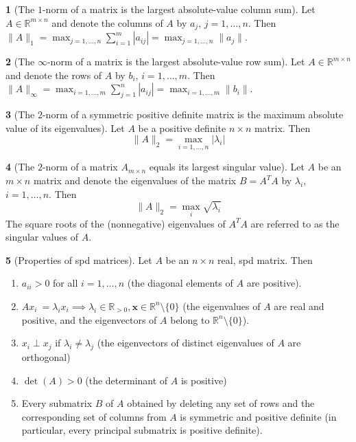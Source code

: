 \documentclass[12pt]{article}
\theoremstyle{definition}
\newtheorem{theorem}{\color{ForestGreen}{\textbf{Theorem}}}
\newcommand{\R}{\mathbb{R}}
\newcommand{\norm}[1]{\lVert#1\rVert}
\newcommand{\x}{\bm{x}}
\begin{document}
\begin{theorem}[The $1$-norm of a matrix is the largest absolute-value column sum]
Let $A \in \R^{m \times n }$ and denote the columns of $A$ by $a_j$, $j=1, \ldots, n$. Then $\norm{A}_1 = \max_{j=1, \ldots, n} \sum_{i=1}^{m} |a_{ij}| =  \max_{j=1, \ldots, n} \norm{a_j}$.
\end{theorem}

\begin{theorem}[The $\infty$-norm of a matrix is the largest absolute-value row sum]
Let $A \in \R^{m \times n }$ and denote the rows of $A$ by $b_i$, $i=1, \ldots, m$. Then $\norm{A}_{\infty} = \max_{i=1, \ldots, m} \sum_{j=1}^{n} |a_{ij}| =  \max_{i=1, \ldots, m} \norm{b_i}$.
\end{theorem}

\begin{theorem}[The $2$-norm of a symmetric positive definite matrix is the maximum absolute value of its eigenvalues]
Let $A$ be a positive definite $n \times n$ matrix. Then
\begin{equation}
\norm{A}_2 = \max_{i=1,\ldots, n} |\lambda_i|
\end{equation}
\end{theorem}

\begin{theorem}[The $2$-norm of a matrix $A_{m \times n}$ equals its largest singular value]
Let $A$ be an $m \times n$ matrix and denote the eigenvalues of the matrix $B = A^TA$ by $\lambda_i$, $i=1,\ldots, n$. Then
\begin{equation}
\norm{A}_2 = \max_i \sqrt{\lambda_i}
\end{equation}
The square roots of the (nonnegative) eigenvalues of $A^TA$ are referred to as the singular values of $A$.
\end{theorem}

\begin{theorem}[Properties of spd matrices]
Let $A$ be an $n \times n$ real, spd matrix. Then
\begin{enumerate}
\item $a_{ii} > 0$ for all $i=1, \ldots, n$ (the diagonal elements of $A$ are positive).
\item $A x_i \ = \lambda_i x_i \implies \lambda_i \in \R_{>0}, \x \in \R^n \setminus \{0\}$ (the eigenvalues of $A$ are real and positive, and the eigenvectors of $A$ belong to $\R^n \setminus \{0\}$).
\item $x_i \perp x_j$ if $\lambda_i \neq \lambda_j$ (the eigenvectors of distinct eigenvalues of $A$ are orthogonal)
\item $\det(A) > 0$ (the determinant of $A$ is positive)
\item Every submatrix $B$ of $A$ obtained by deleting any set of rows and the corresponding set of columns from $A$ is symmetric and positive definite (in particular, every principal submatrix is positive definite).
\end{enumerate}
\end{theorem}
\end{document}

